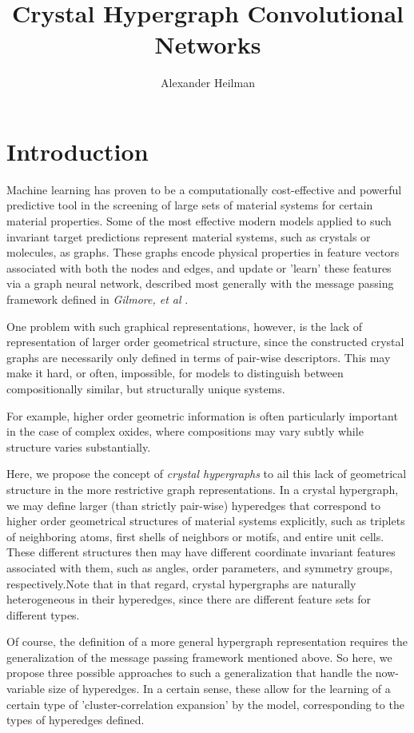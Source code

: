 \documentclass[10pt,a4paper]{article}
\title{Crystal Hypergraph Convolutional Networks}
\author{Alexander Heilman}
\begin{document}
\maketitle
\section{Introduction}
Machine learning has proven to be a computationally cost-effective and powerful predictive tool in the screening of large sets of material systems for certain material properties. Some of the most effective modern models applied to such invariant target predictions represent material systems, such as crystals or molecules, as graphs. These graphs encode physical properties in feature vectors associated with both the nodes and edges, and update or 'learn' these features via a graph neural network, described most generally with the message passing framework defined in \textit{Gilmore, et al} \cite{mpnn}. 

One problem with such graphical representations, however, is the lack of representation of larger order geometrical structure, since the constructed crystal graphs are necessarily only defined in terms of pair-wise descriptors. This may make it hard, or often, impossible, for models to distinguish between compositionally similar, but structurally unique systems. 

For example, higher order geometric information is often particularly important in the case of complex oxides, where compositions may vary subtly while structure varies substantially. 

Here, we propose the concept of \textit{crystal hypergraphs} to ail this lack of geometrical structure in the more restrictive graph representations. In a crystal hypergraph, we may define larger (than strictly pair-wise) hyperedges that correspond to higher order geometrical structures of material systems explicitly, such as triplets of neighboring atoms, first shells of neighbors or motifs, and entire unit cells. These different structures then may have different coordinate invariant features associated with them, such as angles, order parameters, and symmetry groups, respectively.Note that in that regard, crystal hypergraphs are naturally heterogeneous in their hyperedges, since there are different feature sets for different types.

Of course, the definition of a more general hypergraph representation requires the generalization of the message passing framework mentioned above. So here, we propose three possible approaches to such a generalization that handle the now-variable size of hyperedges. In a certain sense, these allow for the learning of a certain type of 'cluster-correlation expansion' by the model, corresponding to the types of hyperedges defined.
\end{document}
